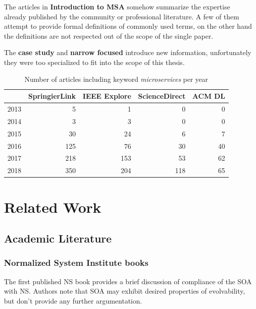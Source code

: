 \documentclass[thesis=M,english,hidelinks]{FITthesis}[2012/10/20]
\begin{document}
The articles in \textbf{Introduction to \acrshort{MSA}} somehow summarize the expertise already published by the community or professional literature. A few of them attempt to provide formal definitions of commonly used terms, on the other hand the definitions are not respected out of the scope of the single paper.

The \textbf{case study} and \textbf{narrow focused} introduce new information, unfortunately they were too specialized to fit into the scope of this thesis.

\begin{table}[b]
\centering
\caption{Number of articles including keyword \textit{microservices} per year}
\label{tab:ms_trends}
\begin{tabular}{r|r|r|r|r}
              & \textbf{SpringierLink}  & \textbf{IEEE Explore} & \textbf{ScienceDirect} & \textbf{ACM DL}                \\ 
\hline
2013 & 5                       &  1                    & 0                       & 0                             \\ 
\hline
2014 & 3                       &  3                    & 0                       & 0                             \\ 
\hline
2015 & 30                      & 24                    & 6                       & 7                             \\ 
\hline
2016 & 125                     & 76                    & 30                      & 40                            \\ 
\hline
2017 & 218                     & 153                   & 53                      & 62                            \\ 
\hline
2018 & 350                     & 204                   & 118                     & 65                           
\end{tabular}
\end{table}

% 
% 
\section{Related Work}
\label{sec:related_work}
\subsection{Academic Literature}
\subsubsection*{Normalized System Institute books}
The first published \acrshort{NS} book \cite{ns-recreating} provides a brief discussion of compliance of the \acrfull{SOA} with \acrshort{NS}. Authors note that \acrshort{SOA} may exhibit desired properties of evolvability, but don't provide any further argumentation.
\end{document}
